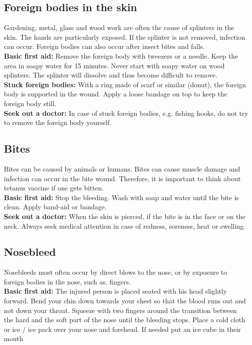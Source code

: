\documentclass[../../../main.tex]{subfiles}
\begin{document}
\begin{multicols}{2}
\subsection*{Foreign bodies in the skin} 
Gardening, metal, glass and wood work are often the cause of splinters in the skin. The hands are particularly exposed. If the splinter is not removed, infection can occur. Foreign bodies can also occur after insect bites and falls.
\\

\textbf{Basic first aid:} Remove the foreign body with tweezers or a needle. Keep the area in soapy water for 15 minutes. Never start with soapy water on wood splinters. The splinter will dissolve and thus become difficult to remove.
\\

\textbf{Stuck foreign bodies:} With a ring made of scarf or similar (donut), the foreign body is supported in the wound. Apply a loose bandage on top to keep the foreign body still. 
\\

\textbf{Seek out a doctor:} In case of stuck foreign bodies, e.g. fishing hooks, do not try to remove the foreign body yourself. 
\\
\subsection*{Bites} Bites can be caused by animals or humans. Bites can cause muscle damage and infection can occur in the bite wound. Therefore, it is important to think about tetanus vaccine if one gets bitten.
\\

\textbf{Basic first aid:} Stop the bleeding. Wash with soap and water until the bite is clean. Apply band-aid or bandage.
\\

\textbf{Seek out a doctor:} When the skin is pierced, if the bite is in the face or on the neck. Always seek medical attention in case of redness, soreness, heat or swelling.
\\

\subsection*{Nosebleed}Nosebleeds most often occur by direct blows to the nose, or by exposure to foreign bodies in the nose, such as. fingers.
\\

\textbf{Basic first aid:} The injured person is placed seated with his head slightly forward. Bend your chin down towards your chest so that the blood runs out and not down your throat. Squeeze with two fingers around the transition between the hard and the soft part of the nose until the bleeding stops. Place a cold cloth or ice / ice pack over your nose and forehead. If needed put an ice cube in their mouth
\\


\end{multicols}
\end{document}
